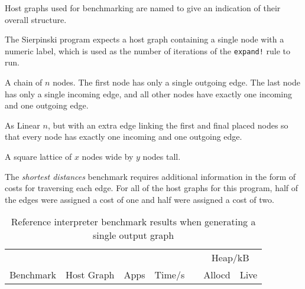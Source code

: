 Host graphs used for benchmarking are named to give an indication of their overall structure.

\begin{description}
	\setlength\itemsep{-0.2em}
	\item[Gen $n$] The Sierpinski program expects a host graph containing a single node with a numeric label, which is used as the number of iterations of the \texttt{expand!} rule to run.

	\item[Linear $n$] A chain of $n$ nodes. The first node has only a single outgoing edge. The last node has only a single incoming edge, and all other nodes have exactly one incoming and one outgoing edge.

	\item[Cyclic $n$] As Linear $n$, but with an extra edge linking the first and final placed nodes so that every node has exactly one incoming and one outgoing edge.

	\item[$x \times y$ Grid] A square lattice of $x$ nodes wide by $y$ nodes tall.
\end{description}

The \textit{shortest distances} benchmark requires additional information in the form of costs for traversing each edge. For all of the host graphs for this program, half of the edges were assigned a cost of one and half were assigned a cost of two.




\begin{table}[h]
\begin{minipage}{\textwidth}
\centering

\begin{tabular}{llrrcrr}
\hline 
&  & & & & \multicolumn{2}{c}{Heap/kB}\\
Benchmark          & Host Graph\footnotemark & Apps & Time/s   & & Allocd & Live \\
\hline 

\end{tabular}

\caption[Reference interpreter benchmarks]{Reference interpreter benchmark results when generating a single output graph}

\label{table:resultsSingle}
\end{minipage}
\end{table}



